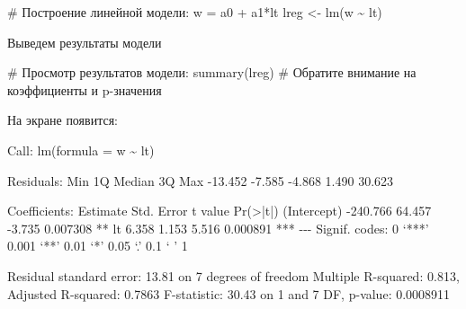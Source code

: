 \documentclass[
  letterpaper,
  DIV=11,
  numbers=noendperiod]{scrreprt}
\newenvironment{Shaded}{\begin{snugshade}}{\end{snugshade}}
\newcommand{\AttributeTok}[1]{\textcolor[rgb]{0.40,0.45,0.13}{#1}}
\newcommand{\CommentTok}[1]{\textcolor[rgb]{0.37,0.37,0.37}{#1}}
\newcommand{\DecValTok}[1]{\textcolor[rgb]{0.68,0.00,0.00}{#1}}
\newcommand{\ErrorTok}[1]{\textcolor[rgb]{0.68,0.00,0.00}{#1}}
\newcommand{\FloatTok}[1]{\textcolor[rgb]{0.68,0.00,0.00}{#1}}
\newcommand{\FunctionTok}[1]{\textcolor[rgb]{0.28,0.35,0.67}{#1}}
\newcommand{\NormalTok}[1]{\textcolor[rgb]{0.00,0.23,0.31}{#1}}
\newcommand{\OtherTok}[1]{\textcolor[rgb]{0.00,0.23,0.31}{#1}}
\newcommand{\SpecialCharTok}[1]{\textcolor[rgb]{0.37,0.37,0.37}{#1}}
\begin{document}
\begin{Shaded}
\begin{Highlighting}[]
\CommentTok{\# Построение линейной модели: w = a0 + a1*lt}
\NormalTok{lreg }\OtherTok{\textless{}{-}} \FunctionTok{lm}\NormalTok{(w }\SpecialCharTok{\textasciitilde{}}\NormalTok{ lt)}
\end{Highlighting}
\end{Shaded}

Выведем результаты модели

\begin{Shaded}
\begin{Highlighting}[]
\CommentTok{\# Просмотр результатов модели:}
\FunctionTok{summary}\NormalTok{(lreg)  }\CommentTok{\# Обратите внимание на коэффициенты и p{-}значения}
\end{Highlighting}
\end{Shaded}

На экране появится:

\begin{Shaded}
\begin{Highlighting}[]
\NormalTok{Call}\SpecialCharTok{:}
\FunctionTok{lm}\NormalTok{(}\AttributeTok{formula =}\NormalTok{ w }\SpecialCharTok{\textasciitilde{}}\NormalTok{ lt)}

\NormalTok{Residuals}\SpecialCharTok{:}
\NormalTok{    Min      }\DecValTok{1}\NormalTok{Q  Median      }\DecValTok{3}\NormalTok{Q     Max }
\SpecialCharTok{{-}}\FloatTok{13.452}  \SpecialCharTok{{-}}\FloatTok{7.585}  \SpecialCharTok{{-}}\FloatTok{4.868}   \FloatTok{1.490}  \FloatTok{30.623} 

\NormalTok{Coefficients}\SpecialCharTok{:}
\NormalTok{            Estimate Std. Error t value }\FunctionTok{Pr}\NormalTok{(}\SpecialCharTok{\textgreater{}}\ErrorTok{|}\NormalTok{t}\SpecialCharTok{|}\NormalTok{)    }
\NormalTok{(Intercept) }\SpecialCharTok{{-}}\FloatTok{240.766}     \FloatTok{64.457}  \SpecialCharTok{{-}}\FloatTok{3.735} \FloatTok{0.007308} \SpecialCharTok{**} 
\NormalTok{lt             }\FloatTok{6.358}      \FloatTok{1.153}   \FloatTok{5.516} \FloatTok{0.000891} \SpecialCharTok{**}\ErrorTok{*}
\SpecialCharTok{{-}{-}{-}}
\NormalTok{Signif. codes}\SpecialCharTok{:}  \DecValTok{0}\NormalTok{ ‘}\SpecialCharTok{**}\ErrorTok{*}\NormalTok{’ }\FloatTok{0.001}\NormalTok{ ‘}\SpecialCharTok{**}\NormalTok{’ }\FloatTok{0.01}\NormalTok{ ‘}\SpecialCharTok{*}\NormalTok{’ }\FloatTok{0.05}\NormalTok{ ‘.’ }\FloatTok{0.1}\NormalTok{ ‘ ’ }\DecValTok{1}

\NormalTok{Residual standard error}\SpecialCharTok{:} \FloatTok{13.81}\NormalTok{ on }\DecValTok{7}\NormalTok{ degrees of freedom}
\NormalTok{Multiple R}\SpecialCharTok{{-}}\NormalTok{squared}\SpecialCharTok{:}  \FloatTok{0.813}\NormalTok{,     Adjusted R}\SpecialCharTok{{-}}\NormalTok{squared}\SpecialCharTok{:}  \FloatTok{0.7863} 
\NormalTok{F}\SpecialCharTok{{-}}\NormalTok{statistic}\SpecialCharTok{:} \FloatTok{30.43}\NormalTok{ on }\DecValTok{1}\NormalTok{ and }\DecValTok{7}\NormalTok{ DF,  p}\SpecialCharTok{{-}}\NormalTok{value}\SpecialCharTok{:} \FloatTok{0.0008911}
\end{Highlighting}
\end{Shaded}
\end{document}
